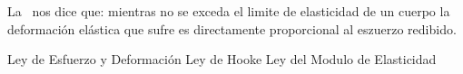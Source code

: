 
\question La \fillin\ nos dice que: mientras no se exceda el limite de
          elasticidad de un cuerpo la deformación elástica que sufre es
          directamente proporcional al eszuerzo redibido.

  \begin{oneparchoices}
    \choice Ley de Esfuerzo y Deformación
    \CorrectChoice Ley de Hooke
    \choice Ley del Modulo de Elasticidad
  \end{oneparchoices}
